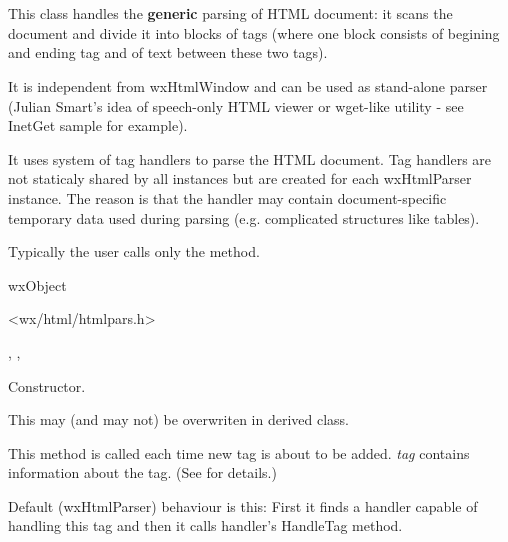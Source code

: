 %
%

\section{}\label{wxhtmlparser}

This class handles the {\bf generic} parsing of HTML document: it scans
the document and divide it into blocks of tags (where one block
consists of begining and ending tag and of text between these
two tags).

It is independent from wxHtmlWindow and can be used as stand-alone parser
(Julian Smart's idea of speech-only HTML viewer or wget-like utility -
see InetGet sample for example).

It uses system of tag handlers to parse the HTML document. Tag handlers
are not staticaly shared by all instances but are created for each
wxHtmlParser instance. The reason is that the handler may contain
document-specific temporary data used during parsing (e.g. complicated
structures like tables).

Typically the user calls only the  method.


wxObject


<wx/html/htmlpars.h>


,
,


\label{wxhtmlparserwxhtmlparser}


Constructor.

\label{wxhtmlparseraddtag}


This may (and may not) be overwriten in derived class.

This method is called each time new tag is about to be added. 
{\it tag} contains information about the tag. (See 
for details.)

Default (wxHtmlParser) behaviour is this:
First it finds a handler capable of handling this tag and then it calls
handler's HandleTag method.

